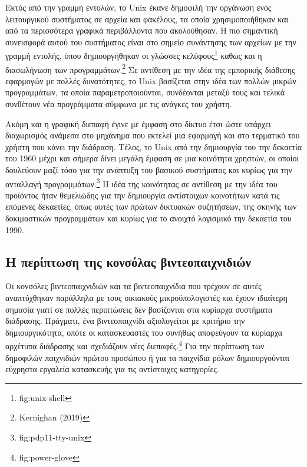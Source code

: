 \documentclass[
]{article}
\begin{document}
Εκτός από την γραμμή εντολών, το Unix έκανε δημοφιλή την οργάνωση ενός
λειτουργικού συστήματος σε αρχεία και φακέλους, τα οποία
χρησιμοποιήθηκαν και από τα περισσότερα γραφικά περιβάλλοντα που
ακολούθησαν. Η πιο σημαντική συνεισφορά αυτού του συστήματος είναι στο
σημείο συνάντησης των αρχείων με την γραμμή εντολής, όπου δημιουργήθηκαν
οι γλώσσες κελύφους\footnote{fig:unix-shell} καθως και η διασωλήνωση των
προγραμμάτων.\footnote{Kernighan (2019)} Σε αντίθεση με την ιδέα της
εμπορικής διάθεσης εφαρμογών με πολλές δυνατότητες, το Unix βασίζεται
στην ιδέα των πολλών μικρών προγραμμάτων, τα οποία παραμετροποιούνται,
συνδέονται μεταξύ τους και τελικά συνθέτουν νέα προγράμματα σύμφωνα με
τις ανάγκες του χρήστη.

Ακόμη και η γραφική διεπαφή έγινε με έμφαση στο δίκτυο έτσι ώστε υπάρχει
διαχωρισμός ανάμεσα στο μηχάνημα που εκτελεί μια εφαρμογή και στο
τερματικό του χρήστη που κάνει την διάδραση. Τέλος, το Unix από την
δημιουργία του την δεκαετία του 1960 μέχρι και σήμερα δίνει μεγάλη
έμφαση σε μια κοινότητα χρηστών, οι οποίοι δουλεύουν μαζί τόσο για την
ανάπτυξη του βασικού συστήματος και κυρίως για την ανταλλαγή
προγραμμάτων.\footnote{fig:pdp11-tty-unix} Η ιδέα της κοινότητας σε
αντίθεση με την ιδέα του προϊόντος ήταν θεμελιώδης για την δημιουργία
αντίστοιχων κοινοτήτων κατά τις επόμενες δεκαετίες, όπως αυτές των
πρώτων δικτυακών συζητήσεων, της σκηνής των δοκιμαστικών προγραμμάτων
και κυρίως για το ανοιχτό λογισμικό την δεκαετία του 1990.

\hypertarget{ux3b7-ux3c0ux3b5ux3c1ux3afux3c0ux3c4ux3c9ux3c3ux3b7-ux3c4ux3b7ux3c2-ux3baux3bfux3bdux3c3ux3ccux3bbux3b1ux3c2-ux3b2ux3b9ux3bdux3c4ux3b5ux3bfux3c0ux3b1ux3b9ux3c7ux3bdux3b9ux3b4ux3b9ux3ceux3bd}{%
\subsection{Η περίπτωση της κονσόλας
βιντεοπαιχνιδιών}\label{ux3b7-ux3c0ux3b5ux3c1ux3afux3c0ux3c4ux3c9ux3c3ux3b7-ux3c4ux3b7ux3c2-ux3baux3bfux3bdux3c3ux3ccux3bbux3b1ux3c2-ux3b2ux3b9ux3bdux3c4ux3b5ux3bfux3c0ux3b1ux3b9ux3c7ux3bdux3b9ux3b4ux3b9ux3ceux3bd}}

Οι κονσόλες βιντεοπαιχνιδιών και τα βιντεοπαιχνίδια που τρέχουν σε αυτές
αναπτύχθηκαν παράλληλα με τους οικιακούς μικροϋπολογιστές και έχουν
ιδιαίτερη σημασία γιατί σε πολλές περιπτώσεις δεν βασίζονται στα
κυρίαρχα συστήματα διάδρασης. Πράγματι, ένα βιντεοπαιχνίδι αξιολογείται
με κριτήριο την δημιουργικότητα, οπότε οι κατασκευαστές του συνήθως
αποφεύγουν τα κυρίαρχα αρχέτυπα διάδρασης και σχεδιάζουν νέες
διεπαφές.\footnote{fig:power-glove} Για την περίπτωση των δημοφιλών
παιχνιδιών πρώτου προσώπου ή για τα παιχνίδια ρόλων δημιουργούνται
εύχρηστα εργαλεία κατασκευής για τις αντίστοιχες κατηγορίες.
\end{document}
